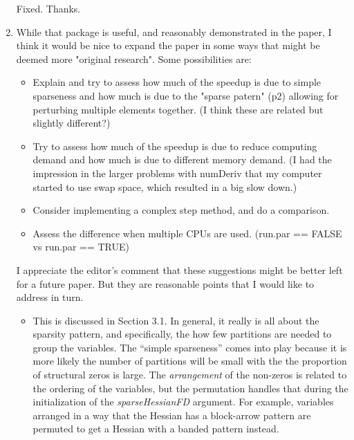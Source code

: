 \documentclass{article}
\newcommand{\class}[1]{\textsl{#1}}
\newenvironment{revQuote}{\itshape}{\vspace{\baselineskip}}
\newenvironment{response}{\normalfont}{\vspace{\baselineskip}}
\begin{document}
\begin{enumerate}[align=left]
  \begin{response}
    Fixed.  Thanks.
  \end{response}

\item\begin{revQuote}

While that package is useful, and reasonably demonstrated in the paper,
I think it would be nice to expand the paper in some ways that might be
deemed more "original research". Some possibilities are:
\begin{itemize}
 \item Explain and try to assess how much of the speedup is due to simple
sparseness and how much is due to the "sparse patern" (p2) allowing for
perturbing multiple elements together. (I think these are related but
slightly different?)
 
 \item Try to assess how much of the speedup is due to reduce computing demand
and how much is due to different memory demand. (I had the impression in the
larger problems with numDeriv that my computer started to use swap space,
which resulted in a big slow down.)
 
 \item Consider implementing a complex step method, and do a comparison.
 
 \item  Assess the difference when multiple CPUs are used. (run.par == FALSE vs
run.par == TRUE)
\end{itemize}
  \end{revQuote}
  
  \begin{response}
I appreciate the editor's comment that these suggestions might be
better left for a future paper.  But they are reasonable points that I
would like to address in turn.
    \begin{itemize}
    \item This is discussed in Section 3.1.  In general, it really is all about the sparsity pattern, and
      specifically, the how few partitions are needed to group the
      variables.  The ``simple sparseness'' comes into play because it
      is more likely the number of partitions will be small with the
      the proportion of structural zeros is large. The \emph{arrangement} of the non-zeros is
      related to the ordering of the variables, but the permutation
      handles that during the initialization of the
      \class{sparseHessianFD} argument.  For example, variables
      arranged in a way that the Hessian has a block-arrow pattern are
      permuted to get a Hessian with a banded pattern instead.
      

\end{itemize}
\end{response}
\end{enumerate}
\end{document}
